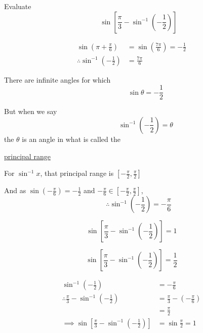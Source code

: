 \documentclass[14pt,fleqn]{extarticle}
\begin{document}
 

Evaluate 
\[ \qquad \sin \left[ \frac\pi{3} - \sin^{-1}\left(-\frac{1}{2} \right) \right] \] 
%

\newcard 

\begin{align}
\sin\left( \pi + \frac\pi{6}\right) &= \sin\left( \frac{7\pi}{6} \right)  = -\frac{1}{2} \\
\therefore \sin^{-1}\left( -\frac{1}{2} \right) &= \frac{7\pi}{6} 
\end{align} 

\newcard 

There are infinite angles for which 
\[ \qquad\qquad \sin\theta = -\frac{1}{2} \]

But when we say \[\qquad \qquad\sin^{-1}\left(-\frac{1}{2}\right) = \theta\]
the $\theta$ is an angle in what is called the

\underline{principal range}\newline 


For $\sin^{-1} x$, that principal range is $ \left[-\frac\pi{2},\frac\pi{2}\right]$\newline 


And as $\sin\left( -\frac\pi{6}\right) = -\frac{1}{2}$ and $-\frac\pi{6}\in\left[ -\frac\pi{2},\frac\pi{2}\right]$,
\[ \qquad \therefore \sin^{-1}\left( -\frac{1}{2}\right) = -\frac\pi{6} \]
%

\newcard 

\[ \sin \left[ \frac\pi{3} - \sin^{-1}\left(-\frac{1}{2} \right) \right] = 1 \]

\newcard 

\[ \sin \left[ \frac\pi{3} - \sin^{-1}\left(-\frac{1}{2} \right) \right] = \frac{1}{2} \]

\newcard 

\begin{align}
\sin^{-1}\left(-\frac{1}{2}  \right) &= -\frac\pi{6} \\
\therefore \frac\pi{3} - \sin^{-1}\left(-\frac{1}{2}  \right)  &= \frac\pi{3} - \left( -\frac\pi{6} \right)\\
&= \frac\pi{2} \\
\implies \sin \left[ \frac\pi{3} - \sin^{-1}\left(-\frac{1}{2} \right) \right] &= \sin\frac\pi{2}= 1
\end{align}
\end{document}
